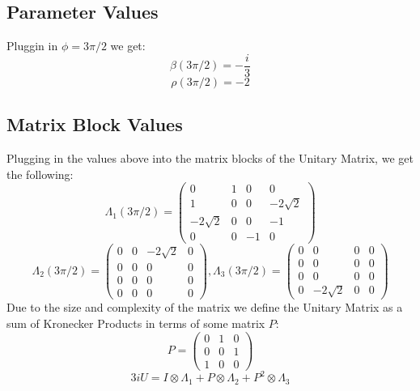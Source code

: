 \subsection{Parameter Values}
Pluggin in $\phi = 3\pi/2$ we get:
\begin{equation}
    \beta(3\pi/2) = -\frac{i}{3}
\end{equation}
\begin{equation}
    \rho(3\pi/2) = -2 
\end{equation}
\subsection{Matrix Block Values}
Plugging in the values above into the matrix blocks of the Unitary Matrix, we get the following:
\begin{equation}
     \Lambda_{1}(3\pi/2)  = \begin{pmatrix} 0 & 1 & 0 & 0 \\ 1 & 0 & 0 & -2\sqrt{2} \\ -2\sqrt{2} & 0 & 0 & -1 \\ 0 & 0 & -1 & 0 \end{pmatrix}
\end{equation}
\begin{equation}
    \Lambda_{2}(3\pi/2) = \begin{pmatrix} 0 & 0 & -2\sqrt{2} & 0 \\ 0 & 0 & 0 & 0 \\ 0 & 0 & 0 & 0 \\ 0 & 0 & 0 & 0 \end{pmatrix} 
    , \Lambda_{3} (3\pi/2) = \begin{pmatrix} 0 & 0 & 0 & 0 \\ 0 & 0 & 0 & 0 \\ 0 & 0 & 0 & 0 \\ 0 & -2\sqrt{2} & 0 & 0 \end{pmatrix}
\end{equation}
Due to the size and complexity of the matrix we define the Unitary Matrix as a sum of Kronecker Products in terms of some matrix $P$:
\begin{equation}
    P = \begin{pmatrix} 0 & 1 & 0 \\ 0 & 0 & 1 \\ 1 & 0 & 0 \end{pmatrix}
\end{equation}
\begin{equation}
    3iU = I \otimes \Lambda_{1} + P \otimes \Lambda_{2} + P^{2} \otimes \Lambda_{3}
\end{equation}
